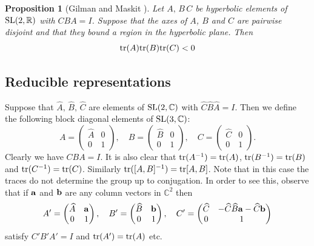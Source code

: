 \documentclass[11pt]{amsart}
\newtheorem{proposition}[theorem]{Proposition}
\numberwithin{equation}{section}
\begin{document}
\begin{proposition}[Gilman and Maskit \cite{G-M}]\label{prop-gm}
Let $A,\,B\,C$ be hyperbolic elements of ${\rm SL}(2,\mathbb{R})$ with $CBA=I$. Suppose that the axes of 
$A$, $B$ and $C$ are pairwise disjoint and that they bound a region in the hyperbolic plane. Then
\begin{equation*}
{\rm tr}(A){\rm tr}(B){\rm tr}(C)<0
\end{equation*}
\end{proposition}


\subsection{Reducible representations}

Suppose that $\widehat{A},\,\widehat{B},\,\widehat{C}$ are elements of ${\rm SL}(2,{\mathbb C})$ with 
$\widehat{C}\widehat{B}\widehat{A}=I$. 
Then we define the following
block diagonal elements of ${\rm SL}(3,{\mathbb C})$:
\begin{equation}\label{eq-red-A-B-C}
A=\left(\begin{matrix} \widehat{A} & 0 \\ 0 & 1 \end{matrix}\right), \quad 
B=\left(\begin{matrix} \widehat{B} & 0 \\ 0 & 1 \end{matrix}\right), \quad 
C=\left(\begin{matrix} \widehat{C} & 0 \\ 0 & 1 \end{matrix}\right).
\end{equation}
Clearly we have $CBA=I$. It is also clear that ${\rm tr}(A^{-1})={\rm tr}(A)$, ${\rm tr}(B^{-1})={\rm tr}(B)$ and 
${\rm tr}(C^{-1})={\rm tr}(C)$. Similarly ${\rm tr}([A,B]^{-1})={\rm tr}[A,B]$.
Note that in this case the traces do not determine the group up to conjugation. In order to see this, observe that if ${\bf a}$
and ${\bf b}$ are any column vectors in ${\mathbb C}^2$ then 
$$
A'=\left(\begin{matrix} \widehat{A} & {\bf a} \\ 0 & 1 \end{matrix}\right), \quad 
B'=\left(\begin{matrix} \widehat{B} & {\bf b} \\ 0 & 1 \end{matrix}\right), \quad 
C'=\left(\begin{matrix} \widehat{C} & -\widehat{C}\widehat{B}{\bf a} -\widehat{C}{\bf b} \\ 0 & 1 \end{matrix}\right)
$$
satisfy $C'B'A'=I$ and ${\rm tr}(A')={\rm tr}(A)$ etc.
\end{document}
